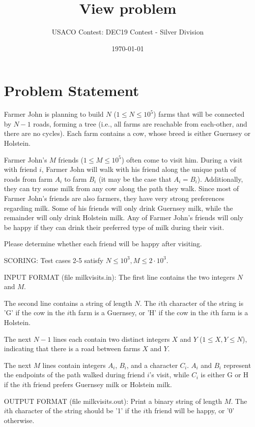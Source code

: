 \documentclass[12pt]{article}
\title{View problem}
\author{USACO Contest: DEC19 Contest - Silver Division}
\date{\today}
\begin{document}
\maketitle

\section*{Problem Statement}

Farmer John is planning to build $N$ ($1 \leq N \leq 10^5$) farms that will be
connected by $N-1$ roads, forming a tree (i.e., all farms are reachable from
each-other, and there are no cycles). Each farm contains a cow, whose breed is
either Guernsey or Holstein. 

Farmer John's $M$ friends ($1 \leq M \leq 10^5$) often come to visit him. During
a visit with friend $i$, Farmer John will walk with his friend along the unique
path of roads from farm $A_i$ to farm $B_i$ (it may be the case that
$A_i = B_i$). Additionally, they can try some milk from any cow along the path
they walk. Since most of Farmer John's friends are also farmers, they have very
strong preferences regarding milk. Some of his friends will only drink Guernsey
milk, while the remainder will only drink Holstein milk. Any of Farmer John's
friends will only be happy if they can drink their preferred type of milk during
their visit.

Please determine whether each friend will be happy after visiting.

SCORING:
Test cases 2-5 satisfy $N\le 10^3, M\le 2\cdot 10^3.$ 

INPUT FORMAT (file milkvisits.in):
The first line contains the two integers $N$ and $M$.

The second line contains a string of length $N$. The $i$th character of the
string is 'G' if the cow in the $i$th farm is a Guernsey, or 'H' if the cow in
the $i$th farm is a Holstein.

The next $N-1$ lines each contain two distinct integers $X$ and $Y$ 
($1 \leq X, Y \leq N$), indicating that there is a road between farms $X$ and
$Y$. 

The next $M$ lines contain integers $A_i$, $B_i$, and a character $C_i$. $A_i$
and $B_i$ represent the endpoints of the path walked during friend $i$'s visit, 
while $C_i$ is either G or H if the $i$th friend prefers Guernsey milk or
Holstein milk.

OUTPUT FORMAT (file milkvisits.out):
Print a binary string of length $M$. The $i$th character of the string should be
'1' if the $i$th friend will be happy, or '0' otherwise.
\end{document}
